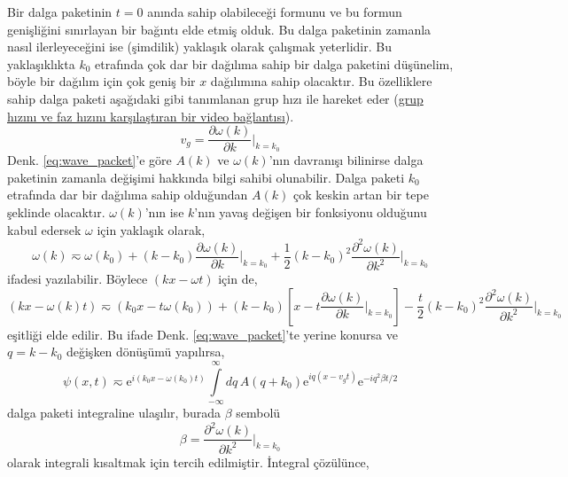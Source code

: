 \documentclass[00_kitap.tex]{subfiles}
\begin{document}
Bir dalga paketinin $t=0$ anında sahip olabileceği formunu ve bu formun genişliğini sınırlayan bir bağıntı elde etmiş olduk. Bu dalga paketinin zamanla nasıl ilerleyeceğini ise (şimdilik) yaklaşık olarak çalışmak yeterlidir. Bu yaklaşıklıkta $k_0$ etrafında çok dar bir dağılıma sahip bir dalga paketini düşünelim, böyle bir dağılım için çok geniş bir $x$ dağılımına sahip olacaktır. Bu özelliklere sahip dalga paketi aşağıdaki gibi tanımlanan grup hızı ile hareket eder (\href{https://www.youtube.com/watch?annotation_id=annotation_1566711117&feature=iv&src_vid=MMV2Zt7x430&v=v9DPzMoWpc0
}{grup hızını ve faz hızını karşılaştıran bir video bağlantısı}).
\begin{equation}
v_g = \frac{\partial \omega(k)}{\partial k} \bigg |_{k=k_0}
\label{eq:group_velocity}
\end{equation}
Denk. \ref{eq:wave_packet}'e göre $A(k)$ ve $\omega(k)$'nın davranışı bilinirse dalga paketinin zamanla değişimi hakkında bilgi sahibi olunabilir. Dalga paketi $k_0$ etrafında dar bir dağılıma sahip olduğundan $A(k)$ çok keskin artan bir tepe şeklinde olacaktır. $\omega(k)$'nın ise $k$'nın yavaş değişen bir fonksiyonu olduğunu kabul edersek $\omega$ için yaklaşık olarak,
\begin{equation}
\omega(k) \eqsim \omega(k_0) +  (k-k_0) \frac{\partial \omega(k)}{\partial k} \bigg |_{k=k_0} + \frac{1}{2}(k-k_0)^2 \frac{\partial^2 \omega(k)}{\partial k^2} \bigg |_{k=k_0}  
\end{equation}
ifadesi yazılabilir. Böylece $(kx-\omega t)$ için de,
\begin{equation*}
(kx - \omega(k)t) \eqsim (k_0 x - t \omega(k_0)) +  (k-k_0)\left[x - t\frac{\partial \omega(k)}{\partial k} \bigg |_{k=k_0} \right] - \frac{t}{2}(k-k_0)^2 \frac{\partial^2 \omega(k)}{\partial k^2} \bigg |_{k=k_0}  
\end{equation*}
eşitliği elde edilir. Bu ifade Denk. \ref{eq:wave_packet}'te yerine konursa ve $q=k-k_0$ değişken dönüşümü yapılırsa,
\begin{equation}
\psi(x, t) \eqsim  \text{e}^{i(k_0x - \omega(k_0) t)}  \int\limits_{-\infty}^{\infty}dq\,A(q + k_0) \text{e}^{iq(x - v_g t)} \text{e}^{-iq^2\beta t/2} 
\label{eq:wave_packet_t_change}
\end{equation}
dalga paketi integraline ulaşılır, burada $\beta$ sembolü
\begin{equation*}
\beta = \frac{\partial^2 \omega(k)}{\partial k^2}\bigg |_{k=k_0}
\end{equation*}
olarak integrali kısaltmak için tercih edilmiştir. İntegral çözülünce,
\end{document}
